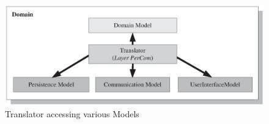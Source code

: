 \begin{figure}[ht]
    \begin{center}
        \includegraphics[scale=0.4]{vector/translator_accessing_models.eps}
        \caption{Translator accessing various Models}
        \label{translator_accessing_models_figure}
    \end{center}
\end{figure}

